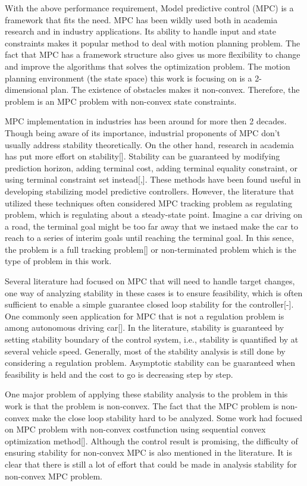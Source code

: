 \documentclass{ifacconf}
\begin{document}
With the above performance requirement, Model predictive control (MPC) is a framework that fits the need. MPC has been wildly used both in academia research and in industry applications. Its ability to handle input and state constraints makes it popular method to deal with motion planning problem. The fact that MPC has a framework structure also gives us more flexibility to change and improve the algorithms that solves the optimization problem. The motion planning environment (the state space) this work is focusing on is a 2-dimensional plan. The existence of obstacles makes it non-convex. Therefore, the problem is an MPC problem with non-convex state constraints. 

MPC implementation in industries has been around for more then 2 decades. Though being aware of its importance, industrial proponents of MPC don't usually address stability theoretically. On the other hand, research in academia has put more effort on stability[]. Stability can be guaranteed by modifying prediction horizon, adding terminal cost, adding terminal equality constraint, or using terminal constraint set instead[,]. These methods have been found useful in developing stabilizing model predictive controllers. However, the literature that utilized these techniques often considered MPC tracking problem as regulating problem, which is regulating about a steady-state point. Imagine a car driving on a road, the terminal goal might be too far away that we instaed make the car to reach to a series of interim goals until reaching the terminal goal. In this sence, the problem is a full tracking problem[] or non-terminated problem which is the type of problem in this work.

Several literature had focused on MPC that will need to handle target changes, one way of analyzing stability in these cases is to ensure feasibility, which is often sufficient to enable a simple guarantee closed loop stability for the controller[-]. One commonly seen application for MPC that is not a regulation problem is among autonomous driving car[]. In the literature, stability is guaranteed by setting stability boundary of the control system, i.e., stability is quantified by at several vehicle speed. Generally, most of the stability analysis is still done by considering a regulation problem. Asymptotic stability can be guaranteed when feasibility is held and the cost to go is decreasing step by step.

One major problem of applying these stability analysis to the problem in this work is that the problem is non-convex. The fact that the MPC problem is non-convex make the close loop stability hard to be analyzed. Some work had focused on MPC problem with non-convex costfunction using sequential convex optimization method[]. Although the control result is promising, the difficulty of ensuring stability for non-convex MPC is also mentioned in the literature. It is clear that there is still a lot of effort that could be made in analysis stability for non-convex MPC problem. 
\end{document}
